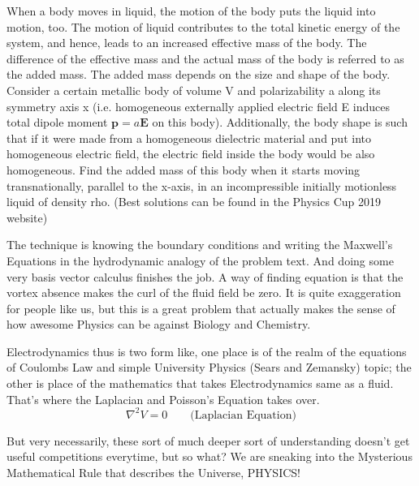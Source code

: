 \documentclass[11pt,a4paper]{article}
\renewcommand{\vec}[1]{\boldsymbol{#1}}
\begin{document}
	
{\sffamily When a body moves in liquid, the motion of the body puts the liquid into motion, too. The motion of liquid contributes to the total kinetic energy of the system, and hence, leads to an increased effective mass of the body. The difference of the effective mass and the actual mass of the body is referred to as the added mass. The added mass depends on the size and shape of the body. Consider a certain metallic body of volume V and polarizability a along its symmetry axis x (i.e. homogeneous externally applied electric field E induces total dipole moment $\vec{p} = a\vec{E}$ on this body). Additionally, the body shape is such that if it were made from a homogeneous dielectric material and put into homogeneous electric field, the electric field inside the body would be also homogeneous. Find the added mass of this body when it starts moving transnationally, parallel to the x-axis, in an incompressible initially motionless liquid of density rho. (Best solutions can be found in the Physics Cup 2019 website)}


The technique is knowing the boundary conditions and writing the Maxwell's Equations in the hydrodynamic analogy of the problem text. And doing some very basis vector calculus finishes the job. A way of finding equation is that the vortex absence makes the curl of the fluid field be zero. It is quite exaggeration for people like us, but this is a great problem that actually makes the sense of how awesome Physics can be against Biology and Chemistry.


	Electrodynamics thus is two form like, one place is of the realm of the equations of Coulombs Law and simple University Physics (Sears and Zemansky) topic; the other is place of the mathematics that takes Electrodynamics same as a fluid. That's where the Laplacian and Poisson's Equation takes over.
	\begin{equation}
	\nabla^2 V = 0 \qquad \text{(Laplacian Equation)}
	\end{equation}

 But very necessarily, these sort of much deeper sort of understanding doesn't get useful competitions everytime, but so what? We are sneaking into the Mysterious Mathematical Rule that describes the Universe, PHYSICS!

	
	
	
	
	
	
	
	
	
	
	
	
	
	
	
	
\end{document}
